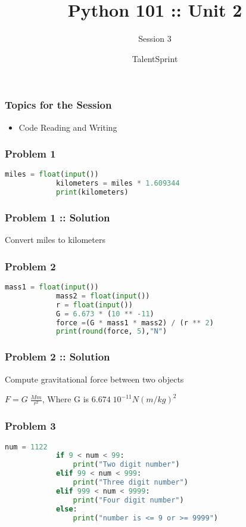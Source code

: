 \documentclass[14pt]{beamer}
\title{Python 101 :: Unit 2}
\subtitle{Session 3}
\date{}
\author[TS]{TalentSprint}
\begin{document}
    \begin{frame}
        \titlepage
    \end{frame}
    \begin{frame}
        \frametitle{Topics for the Session}
        \begin{itemize}
            \item Code Reading and Writing
        \end{itemize}
    \end{frame}
    \begin{frame}[containsverbatim]
        \frametitle{Problem 1}
        \begin{lstlisting}[language=Python]
            miles = float(input())
            kilometers = miles * 1.609344
            print(kilometers)
        \end{lstlisting} 
    \end{frame}
    \begin{frame}
        \frametitle{Problem 1 :: Solution}
        \small Convert miles to kilometers
    \end{frame}
    \begin{frame}[containsverbatim]
        \frametitle{Problem 2}
        \begin{lstlisting}[language=Python]
            mass1 = float(input())
            mass2 = float(input())
            r = float(input())
            G = 6.673 * (10 ** -11)
            force =(G * mass1 * mass2) / (r ** 2)
            print(round(force, 5),"N")
        \end{lstlisting}
    \end{frame}
    \begin{frame}
        \frametitle{Problem 2 :: Solution}
        \small Compute gravitational force between two objects
        \begin{center}
        $F = G\; \frac{Mm}{r^{2}}$, Where G is $6.674 \; 10^{-11} N(m/kg)^{2}$
        \end{center}
    \end{frame}
    \begin{frame}[containsverbatim]
        \frametitle{Problem 3}
        \begin{lstlisting}[language=Python]
            num = 1122
            if 9 < num < 99:
                print("Two digit number")
            elif 99 < num < 999:
                print("Three digit number")
            elif 999 < num < 9999:
                print("Four digit number")
            else:
                print("number is <= 9 or >= 9999")
        \end{lstlisting}
    \end{frame}
\end{document}
